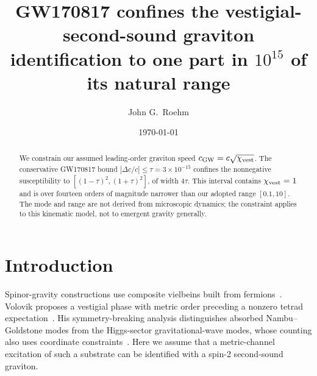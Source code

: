 \documentclass[aps,prl,reprint,nofootinbib,superscriptaddress]{revtex4-2}
\newcommand{\cGW}{c_{\rm GW}}
\newcommand{\chivest}{\chi_{\rm vest}}
\newcommand{\dccap}{\Delta c/c}
\begin{document}
\title{GW170817 confines the vestigial-second-sound graviton
identification to one part in $10^{15}$ of its natural range}

\author{John G.\ Roehm}

\date{\today}

\begin{abstract}
We constrain our assumed leading-order graviton speed
$\cGW=c\sqrt{\chivest}$. The conservative GW170817 bound
$|\dccap|\leq\tau=3\times10^{-15}$ confines the nonnegative
susceptibility to $[(1-\tau)^2,(1+\tau)^2]$, of width $4\tau$.
This interval contains $\chivest=1$ and is over fourteen orders of
magnitude narrower than our adopted range $[0.1,10]$.
The mode and range are not derived from microscopic dynamics;
the constraint applies to this kinematic model, not to emergent
gravity generally.
\end{abstract}

\maketitle

\section{Introduction}
\label{sec:intro}

Spinor-gravity constructions use composite vielbeins built from
fermions~\cite{Diakonov2011,HebeckerWetterich2003}.
Volovik proposes a vestigial phase with metric order preceding a
nonzero tetrad expectation~\cite{Volovik2024Vestigial}.
His symmetry-breaking analysis distinguishes absorbed
Nambu--Goldstone modes from the Higgs-sector gravitational-wave
modes, whose counting also uses coordinate
constraints~\cite{Volovik2022Counting}.
Here we assume that a metric-channel excitation of such a substrate
can be identified with a spin-2 second-sound graviton.
\end{document}
